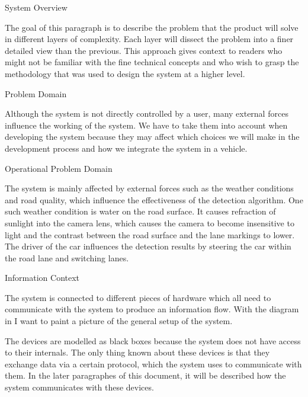 \documentclass{matthijs}
\begin{document}
	\begin{hoofdstuk}{System Overview}

		The goal of this paragraph is to describe the problem that the product will solve in different layers of complexity.
		Each layer will dissect the problem into a finer detailed view than the previous.
		This approach gives context to readers who might not be familiar with the fine technical concepts and who wish to grasp the methodology that was used to design the system at a higher level.

		\begin{paragraaf}{Problem Domain}

			Although the system is not directly controlled by a user, many external forces influence the working of the system.
			We have to take them into account when developing the system because they may affect which choices we will make in the development process and how we integrate the system in a vehicle.

			\vspace{-1ex}
			\begin{figuur}{Operational Problem Domain}
				\singlespacing
				\onehalfspacing
			\end{figuur}

			The system is mainly affected by external forces such as the weather conditions and road quality, which influence the effectiveness of the detection algorithm.
			One such weather condition is water on the road surface.
			It causes refraction of sunlight into the camera lens, which causes the camera to become insensitive to light and the contrast between the road surface and the lane markings to lower.
			The driver of the car influences the detection results by steering the car within the road lane and switching lanes.

		\end{paragraaf}

		\begin{paragraaf}{Information Context}

			The system is connected to different pieces of hardware which all need to communicate with the system to produce an information flow.
			With the diagram in  I want to paint a picture of the general setup of the system.

			\bigskip
			
			The devices are modelled as black boxes because the system does not have access to their internals.
			The only thing known about these devices is that they exchange data via a certain protocol, which the system uses to communicate with them.
			In the later paragraphes of this document, it will be described how the system communicates with these devices.


\end{paragraaf}
\end{hoofdstuk}
\end{document}
